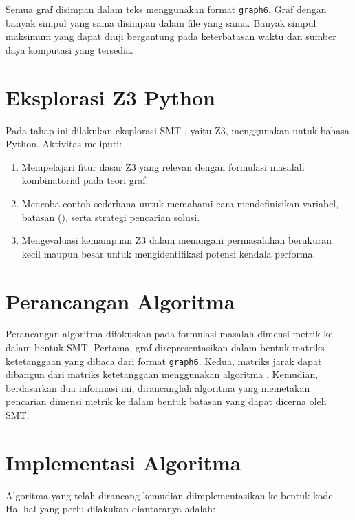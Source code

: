 Semua graf disimpan dalam  teks menggunakan format \verb`graph6`. Graf dengan banyak simpul yang sama disimpan dalam file yang sama. Banyak simpul maksimum yang dapat diuji bergantung pada keterbatasan waktu dan sumber daya komputasi yang tersedia.

\section{Eksplorasi Z3 Python}

Pada tahap ini dilakukan eksplorasi SMT , yaitu Z3, menggunakan  untuk bahasa Python. Aktivitas meliputi:

\begin{enumerate}

	\item Mempelajari fitur dasar Z3 yang relevan dengan formulasi masalah kombinatorial pada teori graf.

	\item Mencoba contoh sederhana untuk memahami cara mendefinisikan variabel, batasan (), serta strategi pencarian solusi.

	\item Mengevaluasi kemampuan Z3 dalam menangani permasalahan berukuran kecil maupun besar untuk mengidentifikasi potensi kendala performa.

\end{enumerate}

\section{Perancangan Algoritma}

Perancangan algoritma difokuskan pada formulasi masalah dimensi metrik ke dalam bentuk SMT. Pertama, graf direpresentasikan dalam bentuk matriks ketetanggaan yang dibaca dari format \verb`graph6`. Kedua, matriks jarak dapat dibangun dari matriks ketetanggaan menggunakan algoritma . Kemudian, berdasarkan dua informasi ini, dirancanglah algoritma yang memetakan pencarian dimensi metrik ke dalam bentuk batasan yang dapat dicerna oleh SMT.

\section{Implementasi Algoritma}

Algoritma yang telah dirancang kemudian diimplementasikan ke bentuk kode. Hal-hal yang perlu dilakukan diantaranya adalah:

